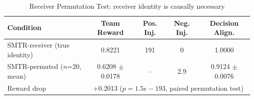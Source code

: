 \begin{table}[t]
\caption{Receiver Permutation Test: receiver identity is causally necessary}
\label{tab:receiver_permutation}
\centering
\begin{tabular}{l c c c c}
\toprule
Condition & Team Reward & Pos. Inj. & Neg. Inj. & Decision Align. \\
\midrule
SMTR-receiver (true identity) & 0.8221 & 191 & 0 & 1.0000 \\
SMTR-permuted ($n$=20, mean) & 0.6208 $\pm$ 0.0178 & -- & 2.9 & 0.9124 $\pm$ 0.0076 \\
\midrule
Reward drop & \multicolumn{4}{c}{+0.2013 ($p = 1.5e-193$, paired permutation test)} \\
\bottomrule
\end{tabular}
\end{table}